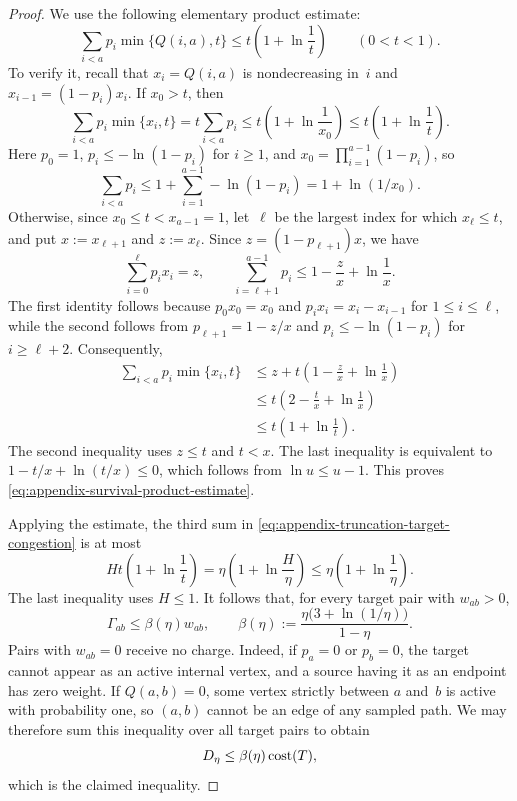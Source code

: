 \documentclass[12pt,a4paper,oneside]{report}
\begin{document}
\begin{proof}
We use the following elementary product estimate:
\begin{equation}\label{eq:appendix-survival-product-estimate}
    \sum_{i<a}p_i\min\{Q(i,a),t\}
    \le t\left(1+\ln\frac1t\right)
    \qquad(0<t<1).
\end{equation}
To verify it, recall that $x_i=Q(i,a)$ is nondecreasing in~$i$ and
$x_{i-1}=(1-p_i)x_i$.  If $x_0>t$, then
\[
    \sum_{i<a}p_i\min\{x_i,t\}
    =t\sum_{i<a}p_i
    \le t\left(1+\ln\frac1{x_0}\right)
    \le t\left(1+\ln\frac1t\right).
\]
Here $p_0=1$, $p_i\le-\ln(1-p_i)$ for $i\ge1$, and
$x_0=\prod_{i=1}^{a-1}(1-p_i)$, so
\[
    \sum_{i<a}p_i
    \le1+\sum_{i=1}^{a-1}-\ln(1-p_i)
    =1+\ln(1/x_0).
\]
Otherwise, since $x_0\le t<x_{a-1}=1$, let~$\ell$ be the largest index
for which $x_\ell\le t$, and put $x:=x_{\ell+1}$ and $z:=x_\ell$.  Since
$z=(1-p_{\ell+1})x$, we have
\[
    \sum_{i=0}^{\ell}p_ix_i=z,
    \qquad
    \sum_{i=\ell+1}^{a-1}p_i
    \le1-\frac zx+\ln\frac1x.
\]
The first identity follows because $p_0x_0=x_0$ and
$p_ix_i=x_i-x_{i-1}$ for $1\le i\le\ell$, while the second follows from
$p_{\ell+1}=1-z/x$ and
$p_i\le-\ln(1-p_i)$ for $i\ge\ell+2$.  Consequently,
\begin{align*}
    \sum_{i<a}p_i\min\{x_i,t\}
    &\le z+t\left(1-\frac{z}{x}+\ln\frac1x\right)\\
    &\le t\left(2-\frac{t}{x}+\ln\frac1x\right)\\
    &\le t\left(1+\ln\frac1t\right).
\end{align*}
The second inequality uses $z\le t$ and $t<x$.
The last inequality is equivalent to
$1-t/x+\ln(t/x)\le0$, which follows from $\ln u\le u-1$.  This proves
\cref{eq:appendix-survival-product-estimate}.

Applying the estimate, the third sum in
\cref{eq:appendix-truncation-target-congestion} is at most
\[
    Ht\left(1+\ln\frac1t\right)
    =\eta\left(1+\ln\frac{H}{\eta}\right)
    \le\eta\left(1+\ln\frac1\eta\right).
\]
The last inequality uses $H\le1$.
It follows that, for every target pair with $w_{ab}>0$,
\[
    \Gamma_{ab}\le\beta(\eta)w_{ab},
    \qquad
    \beta(\eta):=\frac{\eta\bigl(3+\ln(1/\eta)\bigr)}{1-\eta}.
\]
Pairs with $w_{ab}=0$ receive no charge.  Indeed, if $p_a=0$ or $p_b=0$,
the target cannot appear as an active internal vertex, and a source having it
as an endpoint has zero weight.  If $Q(a,b)=0$, some vertex strictly between
$a$ and~$b$ is active with probability one, so $(a,b)$ cannot be an edge of
any sampled path.  We may therefore sum this inequality over all target
pairs to obtain
\[
    D_\eta\le\beta(\eta)\operatorname{cost}(T),
\]
which is the claimed inequality.
\end{proof}

\printbibliography[heading=bibintoc]


\end{document}
